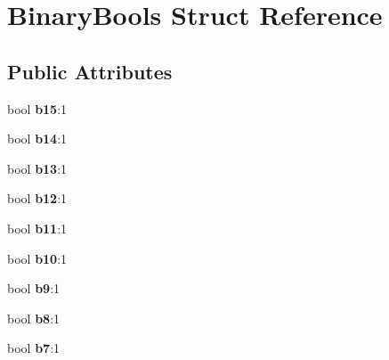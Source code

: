 \hypertarget{structBinaryBools}{}\section{Binary\+Bools Struct Reference}
\label{structBinaryBools}
\subsection*{Public Attributes}
\begin{DoxyCompactItemize}
\item 
bool {\bfseries b15}\+:1\hypertarget{structBinaryBools_a1161cc7f8fdb90de846e9e799e4adb49}{}\label{structBinaryBools_a1161cc7f8fdb90de846e9e799e4adb49}

\item 
bool {\bfseries b14}\+:1\hypertarget{structBinaryBools_a8550a6073b2dd916607ed477b9719f4f}{}\label{structBinaryBools_a8550a6073b2dd916607ed477b9719f4f}

\item 
bool {\bfseries b13}\+:1\hypertarget{structBinaryBools_a33f6a8662892590f78f7f0e77e5523ed}{}\label{structBinaryBools_a33f6a8662892590f78f7f0e77e5523ed}

\item 
bool {\bfseries b12}\+:1\hypertarget{structBinaryBools_ab64e859664031838d342e1afa61ba424}{}\label{structBinaryBools_ab64e859664031838d342e1afa61ba424}

\item 
bool {\bfseries b11}\+:1\hypertarget{structBinaryBools_a2d71de447281acd622e333b0d444b698}{}\label{structBinaryBools_a2d71de447281acd622e333b0d444b698}

\item 
bool {\bfseries b10}\+:1\hypertarget{structBinaryBools_a16eb2df02ced1c81069df3cf29963364}{}\label{structBinaryBools_a16eb2df02ced1c81069df3cf29963364}

\item 
bool {\bfseries b9}\+:1\hypertarget{structBinaryBools_acd6a2053454998446abd30f3c442bf39}{}\label{structBinaryBools_acd6a2053454998446abd30f3c442bf39}

\item 
bool {\bfseries b8}\+:1\hypertarget{structBinaryBools_a79580e5b817aae94f7d8e36ed3343fea}{}\label{structBinaryBools_a79580e5b817aae94f7d8e36ed3343fea}

\item 
bool {\bfseries b7}\+:1\hypertarget{structBinaryBools_af654f6ca97bdd39cc590cbe57482656b}{}\label{structBinaryBools_af654f6ca97bdd39cc590cbe57482656b}


\end{DoxyCompactItemize}
